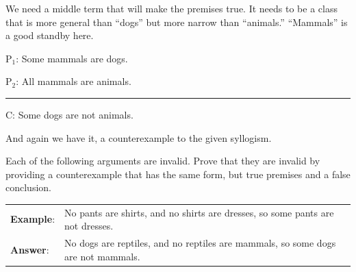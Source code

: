 We need a middle term that will make the premises true. It needs to be a class that is more general than ``dogs'' but more narrow than ``animals.'' ``Mammals'' is a good standby here.

\begin{earg} 
\item[P$_1$:] Some mammals are dogs.
\item[P$_2$:] All mammals are animals.
\vspace{-.5em} 
 \item [] \rule{0.3\linewidth}{.5pt} 
\item[C:] Some dogs are not animals.
 \end{earg}

And again we have it, a counterexample to the given syllogism. 

\practiceproblems

\noindent\problempart Each of the following arguments are invalid. Prove that they are invalid by providing a counterexample that has the same form, but true premises and a false conclusion. 
\begin{longtabu}{p{.1\linewidth}p{.9\linewidth}} 
\textbf{Example}: & No pants are shirts, and no shirts are dresses, so some pants are not dresses. \\ 
\textbf{Answer}: & No dogs are reptiles, and no reptiles are mammals, so some dogs are not mammals.   \\ 
\end{longtabu} 

% 



